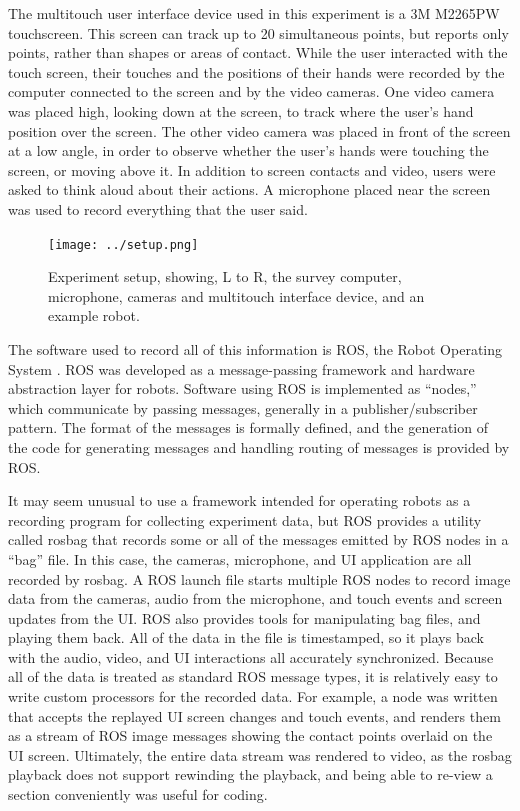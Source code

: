 The multitouch user interface device used in this experiment is a 3M M2265PW touchscreen. 
This screen can track up to 20 simultaneous points, but reports only points, rather than shapes or areas of contact. 
While the user interacted with the touch screen, their touches and the positions of their hands were recorded by the computer connected to the screen and by the video cameras. 
One video camera was placed high, looking down at the screen, to track where the user's hand position over the screen. 
The other video camera was placed in front of the screen at a low angle, in order to observe whether the user's hands were touching the screen, or moving above it. 
In addition to screen contacts and video, users were asked to think aloud about their actions.
A microphone placed near the screen was used to record everything that the user said. 

\begin{figure}
	\centering
	\texttt{[image: ../setup.png]}
	\caption{Experiment setup, showing, L to R, the survey computer, microphone, cameras and multitouch interface device, and an example robot.}
	\label{fig:experiment_setup}
\end{figure}

The software used to record all of this information is ROS, the Robot Operating System \citep{ROS_announcement_paper}. 
ROS was developed as a message-passing framework and hardware abstraction layer for robots. 
Software using ROS is implemented as ``nodes,'' which communicate by passing messages, generally in a publisher/subscriber pattern. 
The format of the messages is formally defined, and the generation of the code for generating messages and handling routing of messages is provided by ROS. 

It may seem unusual to use a framework intended for operating robots as a recording program for collecting experiment data, but ROS provides a utility called rosbag that records some or all of the messages emitted by ROS nodes in a ``bag'' file. 
In this case, the cameras, microphone, and UI application are all recorded by rosbag.
A ROS launch file starts multiple ROS nodes to record image data from the cameras, audio from the microphone, and touch events and screen updates from the UI.
ROS also provides tools for manipulating bag files, and playing them back. 
All of the data in the file is timestamped, so it plays back with the audio, video, and UI interactions all accurately synchronized. 
Because all of the data is treated as standard ROS message types, it is relatively easy to write custom processors for the recorded data.
For example, a node was written that accepts the replayed UI screen changes and touch events, and renders them as a stream of ROS image messages showing the contact points overlaid on the UI screen. 
Ultimately, the entire data stream was rendered to video, as the rosbag playback does not support rewinding the playback, and being able to re-view a section conveniently was useful for coding. 

